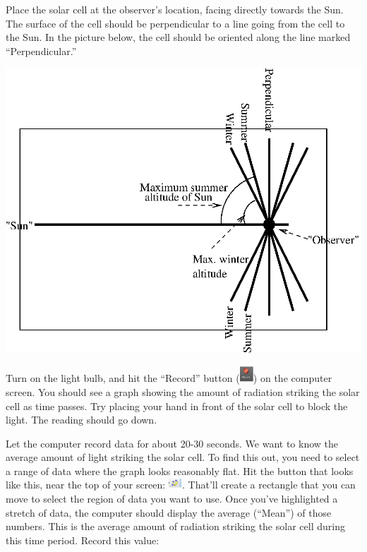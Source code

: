 Place the solar cell at the observer's location,
facing directly towards the Sun. The surface of the cell
should be perpendicular to a line going from the cell to the Sun.
In the picture below, the cell should be oriented along the
line marked ``Perpendicular.''

\centerline{\includegraphics{figs/solarcellfig.eps}}

Turn on the light bulb, and hit the ``Record''
button (\includegraphics[width=0.2in]{figs/capstone-record.eps}) on the
computer screen.  You should see a graph showing the amount
of radiation striking the solar cell as time passes.  Try placing
your hand in front of the solar cell to block the light.  The
reading should go down.

Let the computer record data for about 20-30 seconds.  
We want to know the average amount of light striking the solar
cell. To find this out, you need to select a range of
data where the graph looks reasonably flat.
Hit the button that looks like this, near the top of your screen:
\includegraphics[width=0.2in]{figs/capstone-select.eps}.
That'll create a rectangle that you can move to select the
region of data you want to use.
Once you've highlighted a stretch of data, the computer should
display the average (``Mean'') of those numbers.  This is the 
average amount of radiation striking the solar cell during
this time period.  Record this value:

